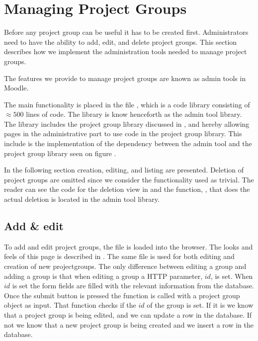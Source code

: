 \section{Managing Project Groups} %
\label{sec:manProjGrpImpl}
Before any project group can be useful it has to be created first.
Administrators need to have the ability to add, edit, and delete project groups.
This section describes how we implement the administration tools needed to manage project groups.

The features we provide to manage project groups are known as admin tools in Moodle.

The main functionality is placed in the file , which is a code library consisting of $\approx 500$ lines of code. 
The library is know henceforth as the admin tool library.
The library includes the project group library discussed in , and hereby allowing pages in the administrative part to use code in the project group library. 
This include is the implementation of the dependency between the admin tool and the project group library seen on figure . 

In the following section creation, editing, and listing are presented. 
Deletion of project groups are omitted since we consider the functionality used as trivial. 
The reader can see the code for the deletion view in  and the function, , that does the actual deletion is located in the admin tool library.

\subsection{Add \& edit}
To add and edit project groups, the file  is loaded into the browser. 
The looks and feels of this page is described in .
The same file is used for both editing and creation of new projectgroups. 
The only difference between editing a group and adding a group is that when editing a group a HTTP parameter, $id$, is set.
When $id$ is set the form fields are filled with the relevant information from the database.
Once the submit button is pressed the function  is called with a project group object as input.
That function checks if the $id$ of the group is set. 
If it is we know that a project group is being edited, and we can update a row in the database.
If not we know that a new project group is being created and we insert a row in the database.

